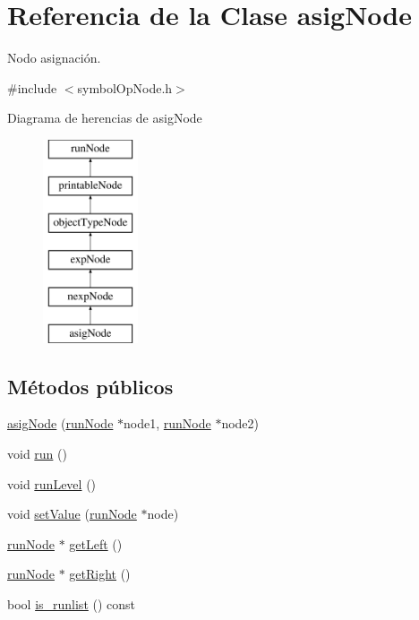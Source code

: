 \hypertarget{classasigNode}{\section{Referencia de la Clase asig\-Node}
\label{classasigNode}
}


Nodo asignación.  




{\ttfamily \#include $<$symbol\-Op\-Node.\-h$>$}

Diagrama de herencias de asig\-Node\begin{figure}[H]
\begin{center}
\leavevmode
\includegraphics[height=6.000000cm]{classasigNode}
\end{center}
\end{figure}
\subsection*{Métodos públicos}
\begin{DoxyCompactItemize}
\item 
\hyperlink{classasigNode_ad8a2612519f5aa530dbdb0efe0987044}{asig\-Node} (\hyperlink{classrunNode}{run\-Node} $\ast$node1, \hyperlink{classrunNode}{run\-Node} $\ast$node2)
\item 
void \hyperlink{classasigNode_a7009318d86f9bcb728933074015fcf22}{run} ()
\item 
void \hyperlink{classasigNode_a2b95850e36d0c65e0e8bbbf2f49d106a}{run\-Level} ()
\item 
void \hyperlink{classasigNode_a5d43f5aacfd7a906a8454cb5ef55ff0a}{set\-Value} (\hyperlink{classrunNode}{run\-Node} $\ast$node)
\item 
\hyperlink{classrunNode}{run\-Node} $\ast$ \hyperlink{classasigNode_a8902a08795822d1e04f0c3a28ed8492b}{get\-Left} ()
\item 
\hyperlink{classrunNode}{run\-Node} $\ast$ \hyperlink{classasigNode_a3aff56b9b19402e286846e7eae023fba}{get\-Right} ()
\item 
bool \hyperlink{classasigNode_a36ca81966c60c93f1b8c38fce719b000}{is\-\_\-runlist} () const 
\end{DoxyCompactItemize}

